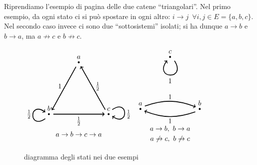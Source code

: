 \begin{ese}
	Riprendiamo l'esempio di pagina \pageref{catene-triangolari} delle due catene ``triangolari''.
	Nel primo esempio, da ogni stato ci si può spostare in ogni altro: $i \to j \enspace \forall i,j \in E = \{a,b,c\}$.
	Nel secondo caso invece ci sono due ``sottosistemi'' isolati; si ha dunque $a \to b$ e $b \to a$, ma $a \not\to c$ e $b \not\to c$.
	\begin{figure}[H]
		\centering
		\(
		\vcenter{\hbox{\begin{tikzpicture}
			\begin{scope}
				\node[circle,fill, label=$b$, scale=0.3] at (0,0) {};
				\node[circle,fill, label=$c$, scale=0.3] at (3,0) {};
				\node[circle,fill, label=$a$, scale=0.3] at (1.5, 2.598) {};

				\node at (0.1,0) {} edge[->, line width=0.4mm]  (2.8,0) ; %
				\node at (2.9,0.1) {} edge[->, line width=0.4mm]  (1.6,2.4); %
				\node at (1.43, 2.5) {} edge[->, line width=0.4mm]  (0.15, 0.2); %

				\node at (1.5, -0.35) {$\frac{1}{2}$};
				\node at (2.45, 1.4) {$\frac{1}{2}$};
				\node at (0.55, 1.4) {$1$};

				\node at (-0.1,-0.1) {} edge[->, line width=0.4mm, looseness=8, bend left=125]  (-0.18, 0.1) ; %
				\node at (3.1,0.1) {} edge[->, line width=0.4mm, looseness=8, bend left=125]  (3.18, -0.1) ; %

				\node at (-1, 0) {$\frac{1}{2}$};
				\node at (4, 0) {$\frac{1}{2}$};
				\node at (1.5, -1) {$a \to b \to c \to a$};

			\end{scope}
		\end{tikzpicture}}}
		\)
		\hskip 50pt
		\(
		\vcenter{\hbox{\begin{tikzpicture}
			\begin{scope}
				\node[circle,fill, label=$a$, scale=0.3] at (0,0) {};
				\node[circle,fill, label=$b$, scale=0.3] at (3,0) {};
				\node[circle,fill, label=$c$, scale=0.3] at (1.5, 2.598) {};

				\node at (0.1,0.1) {} edge[->, line width=0.4mm, looseness=1, bend left=20]  (2.8, 0.1) ; %
				\node at (2.9,-0.1) {} edge[->, line width=0.4mm, looseness=1, bend left=20]  (0.2, -0.1); %

				\node at (1.5, 0.6) {$1$};
				\node at (1.5, -0.6) {$1$};
				\node at (1.6, 2.5) {} edge[->, line width=0.4mm, looseness=8, bend left=125] (1.35,2.42) ; %
				\node at (1.5, 1.4) {$1$};

				\node at (1.5, -1) {$a \to b, \ b \to a$};
				\node at (1.5, -1.5) {$a \not\to c, \ b \not\to c$};
			\end{scope}
		\end{tikzpicture}}}
		\)
		\caption{diagramma degli stati nei due esempi}
	\end{figure}

\end{ese}

